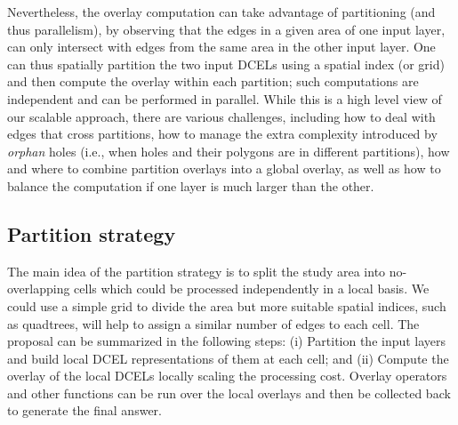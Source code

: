 Nevertheless, the overlay computation can take advantage of partitioning (and thus parallelism), by observing that the edges in a given area of one input layer, can only intersect with edges from the same area in the other input layer. 
One can thus spatially partition the two input DCELs using a spatial index (or grid) and then compute the overlay within each partition; such computations are independent and can be performed in parallel. 
While this is a high level view of our scalable approach, there are various challenges, including how to deal with edges that cross partitions, how to manage the extra complexity introduced by \textit{orphan} holes (i.e., when holes and their polygons are in different partitions), how and where to combine partition overlays into a global overlay, as well as how to balance the computation if one layer is much larger than the other. 



\subsection{Partition strategy} \label{sec:strategy}
The main idea of the partition strategy is to split the study area into no-overlapping cells which could be processed independently in a local basis.  
We could use a simple grid to divide the area but more suitable spatial indices, such as quadtrees, will help to assign a similar number of edges to each cell. 
The proposal can be summarized in the following steps: (i) Partition the input layers and build local DCEL representations of them at each cell; and (ii) Compute the overlay of the local DCELs locally scaling the processing cost. 
Overlay operators and other functions can be run over the local overlays and then be collected back to generate the final answer.  

